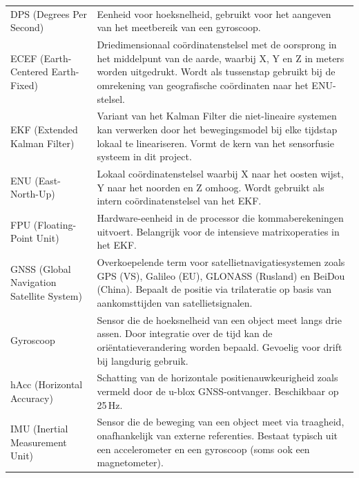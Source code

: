 \begin{longtable}{p{4.5cm} p{10cm}}
    DPS (Degrees Per Second) &
    Eenheid voor hoeksnelheid, gebruikt voor het aangeven van het
    meetbereik van een gyroscoop. \\

    ECEF (Earth-Centered Earth-Fixed) &
    Driedimensionaal coördinatenstelsel met de oorsprong in het
    middelpunt van de aarde, waarbij X, Y en Z in meters worden
    uitgedrukt. Wordt als tussenstap gebruikt bij de omrekening
    van geografische coördinaten naar het ENU-stelsel. \\

    EKF (Extended Kalman Filter) &
    Variant van het Kalman Filter die niet-lineaire systemen kan
    verwerken door het bewegingsmodel bij elke tijdstap lokaal
    te lineariseren. Vormt de kern van het sensorfusie systeem
    in dit project. \\

    ENU (East-North-Up) &
    Lokaal coördinatenstelsel waarbij X naar het oosten wijst,
    Y naar het noorden en Z omhoog. Wordt gebruikt als intern
    coördinatenstelsel van het EKF. \\

    FPU (Floating-Point Unit) &
    Hardware-eenheid in de processor die kommaberekeningen
    uitvoert. Belangrijk voor de intensieve matrixoperaties
    in het EKF. \\

    GNSS (Global Navigation Satellite System) &
    Overkoepelende term voor satellietnavigatiesystemen zoals GPS
    (VS), Galileo (EU), GLONASS (Rusland) en BeiDou (China).
    Bepaalt de positie via trilateratie op basis van
    aankomsttijden van satellietsignalen. \\

    Gyroscoop &
    Sensor die de hoeksnelheid van een object meet langs drie
    assen. Door integratie over de tijd kan de
    oriëntatieverandering worden bepaald. Gevoelig voor drift
    bij langdurig gebruik. \\

    hAcc (Horizontal Accuracy) &
    Schatting van de horizontale positienauwkeurigheid zoals
    vermeld door de u-blox GNSS-ontvanger. Beschikbaar op 25\,Hz. \\

    IMU (Inertial Measurement Unit) &
    Sensor die de beweging van een object meet via traagheid,
    onafhankelijk van externe referenties. Bestaat typisch uit
    een accelerometer en een gyroscoop (soms ook een magnetometer). \\


\end{longtable}
